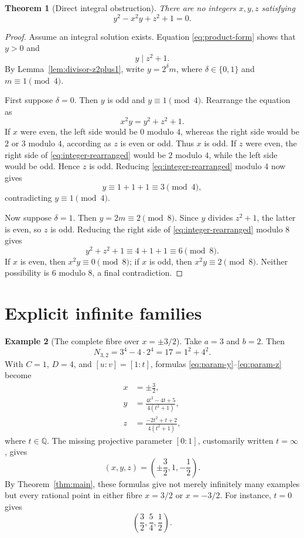 \documentclass[11pt]{article}
\numberwithin{equation}{section}
\newtheorem{theorem}{Theorem}[section]
\theoremstyle{definition}
\newtheorem{example}[theorem]{Example}
\theoremstyle{remark}
\newcommand{\Q}{\mathbb{Q}}
\begin{document}
\begin{theorem}[Direct integral obstruction]\label{thm:direct-integral}
There are no integers $x,y,z$ satisfying
\[
 y^{2}-x^{2}y+z^{2}+1=0.
\]
\end{theorem}

\begin{proof}
Assume an integral solution exists.  Equation \eqref{eq:product-form}
shows that $y>0$ and
\[
 y\mid z^{2}+1.
\]
By Lemma~\ref{lem:divisor-z2plus1}, write
$y=2^{\delta}m$, where $\delta\in\{0,1\}$ and $m\equiv1\pmod4$.

First suppose $\delta=0$.  Then $y$ is odd and $y\equiv1\pmod4$.
Rearrange the equation as
\begin{equation}\label{eq:integer-rearranged}
 x^{2}y=y^{2}+z^{2}+1.
\end{equation}
If $x$ were even, the left side would be $0$ modulo $4$, whereas the
right side would be $2$ or $3$ modulo $4$, according as $z$ is even or
odd.  Thus $x$ is odd.  If $z$ were even, the right side of
\eqref{eq:integer-rearranged} would be $2$ modulo $4$, while the left
side would be odd.  Hence $z$ is odd.  Reducing
\eqref{eq:integer-rearranged} modulo $4$ now gives
\[
 y\equiv1+1+1\equiv3\pmod4,
\]
contradicting $y\equiv1\pmod4$.

Now suppose $\delta=1$.  Then $y=2m\equiv2\pmod8$.  Since $y$ divides
$z^{2}+1$, the latter is even, so $z$ is odd.  Reducing the right side
of \eqref{eq:integer-rearranged} modulo $8$ gives
\[
 y^{2}+z^{2}+1\equiv4+1+1\equiv6\pmod8.
\]
If $x$ is even, then $x^{2}y\equiv0\pmod8$; if $x$ is odd, then
$x^{2}y\equiv2\pmod8$.  Neither possibility is $6$ modulo $8$, a final
contradiction.
\end{proof}

\section{Explicit infinite families}

\begin{example}[The complete fibre over $x=\pm3/2$]\label{ex:three-halves}
Take $a=3$ and $b=2$.  Then
\[
 N_{3,2}=3^{4}-4\cdot2^{4}=17=1^{2}+4^{2}.
\]
With $C=1$, $D=4$, and $[u:v]=[1:t]$, formulas
\eqref{eq:param-y}--\eqref{eq:param-z} become
\begin{align}
 x&=\pm\frac32,\label{eq:explicit-x}\\
 y&=\frac{4t^{2}-4t+5}{4(t^{2}+1)},\label{eq:explicit-y}\\
 z&=\frac{-2t^{2}+t+2}{4(t^{2}+1)},\label{eq:explicit-z}
\end{align}
where $t\in\Q$.  The missing projective parameter $[0:1]$, customarily
written $t=\infty$, gives
\[
 (x,y,z)=\left(\pm\frac32,1,-\frac12\right).
\]
By Theorem~\ref{thm:main}, these formulas give not merely infinitely
many examples but every rational point in either fibre $x=3/2$ or
$x=-3/2$.  For instance, $t=0$ gives
\[
 \left(\frac32,\frac54,\frac12\right).
\]
\end{example}
\end{document}
